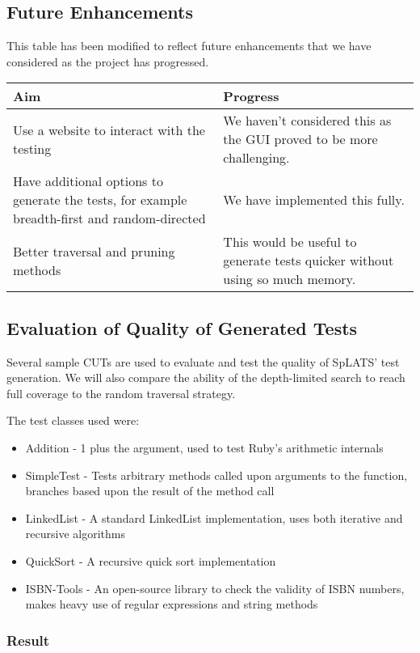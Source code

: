   \subsection{Future Enhancements}
    This table has been modified to reflect future enhancements that we have considered as the project has progressed.
    
    \begin{tabular}{|p{}|p{}|}
    \hline
    \textbf{Aim} & \textbf{Progress} \\
    \hline
    Use a website to interact with the testing &
    We haven't considered this as the GUI proved to be more challenging. \\
    \hline
    Have additional options to generate the tests, for example breadth-first and random-directed &
    We have implemented this fully. \\
    \hline
    Better traversal and pruning methods &
    This would be useful to generate tests quicker without using so much memory. \\
    \hline
    \end{tabular}

  \subsection{Evaluation of Quality of Generated Tests}
    Several sample CUTs are used to evaluate and test the quality of SpLATS'
test generation. We will also compare the ability of the depth-limited search to
reach full coverage to the random traversal strategy.

    The test classes used were:
    \begin{itemize}
      \item Addition - 1 plus the argument, used to test Ruby's arithmetic
internals
      \item SimpleTest - Tests arbitrary methods called upon arguments to the
function, branches based upon the result of the method call
      \item LinkedList - A standard LinkedList implementation, uses both
iterative and recursive algorithms
      \item QuickSort - A recursive quick sort implementation
      \item ISBN-Tools - An open-source library to check the validity of ISBN
numbers, makes heavy use of regular expressions and string methods
    \end{itemize}

  \subsubsection{Result}


